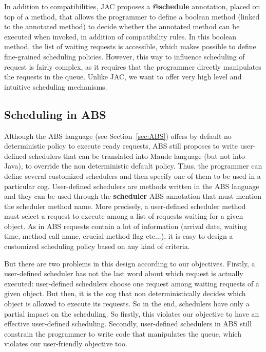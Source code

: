 \documentclass[11pt]{report}
\begin{document}
In addition to compatibilities, JAC proposes a \textbf{@schedule} annotation, placed on top of a method, that allows the programmer to define a boolean method (linked to the annotated method) to decide whether the annotated method can be executed when invoked, in addition of compatibility rules. In this boolean method, the list of waiting requests is accessible, which makes possible to define fine-grained scheduling policies.
However, this way to influence scheduling of request is fairly complex, as it requires that the programmer directly manipulates the requests in the queue. Unlike JAC, we want to offer very high level and intuitive scheduling mechanisms.


\subsection{Scheduling in ABS}
Although the ABS language (see Section~\ref{sec:ABS}) offers by default no deterministic policy to execute ready requests, ABS still proposes to write user-defined schedulers that can be translated into Maude language (but not into Java), to override the non deterministic default policy. Thus, the programmer can define several customized schedulers and then specify one of them to be used in a particular cog. User-defined schedulers are methods written in the ABS language and they can be used through the \textbf{scheduler} ABS annotation that must mention the scheduler method name. More precisely, a user-defined scheduler method must select a request to execute among a list of requests waiting for a given object. As in ABS requests contain a lot of information (arrival date, waiting time, method call name, crucial method flag etc...), it is easy to design a customized scheduling policy based on any kind of criteria. 

But there are two problems in this design according to our objectives. Firstly, a user-defined scheduler has not the last word about which request is actually executed: user-defined schedulers choose one request among waiting requests of a given object. But then, it is the cog that non deterministically decides which object is allowed to execute its requests. So in the end, schedulers have only a partial impact on the scheduling. So firstly, this violates our objective to have an effective user-defined scheduling. Secondly, user-defined schedulers in ABS still constrain the programmer to write code that manipulates the queue, which violates our user-friendly objective too.
\end{document}
